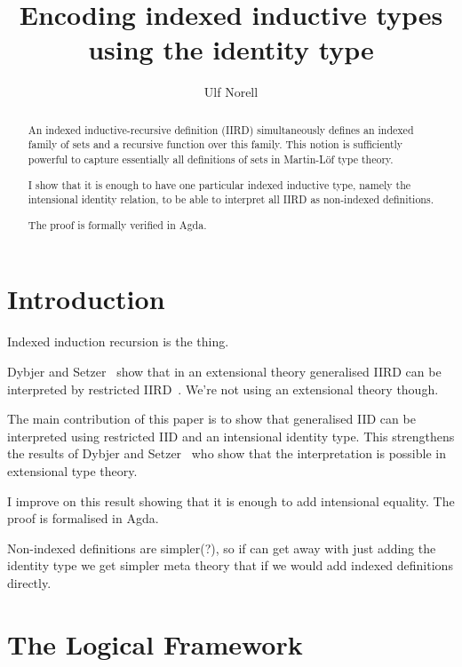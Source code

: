 \documentclass[11pt]{article}
\title{Encoding indexed inductive types using the identity type}
\author{Ulf Norell}
\begin{document}
\maketitle
\begin{abstract}
    An indexed inductive-recursive definition (IIRD) simultaneously defines an
    indexed family of sets and a recursive function over this family.  This
    notion is sufficiently powerful to capture essentially all definitions of
    sets in Martin-Löf type theory.

    I show that it is enough to have one particular indexed inductive type,
    namely the intensional identity relation, to be able to interpret all IIRD
    as non-indexed definitions.
    
    The proof is formally verified in Agda.
\end{abstract}

\section{Introduction}


Indexed induction recursion is the thing.


Dybjer and Setzer~\cite{dybjer:indexed-ir} show that in an extensional theory
generalised IIRD can be interpreted by restricted IIRD~\cite{dybjer:jsl}. We're
not using an extensional theory though.

The main contribution of this paper is to show that generalised IID can be
interpreted using restricted IID and an intensional identity type. This
strengthens the results of Dybjer and Setzer~\cite{dybjer:indexed-ir} who show
that the interpretation is possible in extensional type theory.



I improve on this result showing that it is enough to add intensional equality.
The proof is formalised in Agda.

Non-indexed definitions are simpler(?), so if can get away with just adding the
identity type we get simpler meta theory that if we would add indexed
definitions directly.

\section{The Logical Framework}
\end{document}
